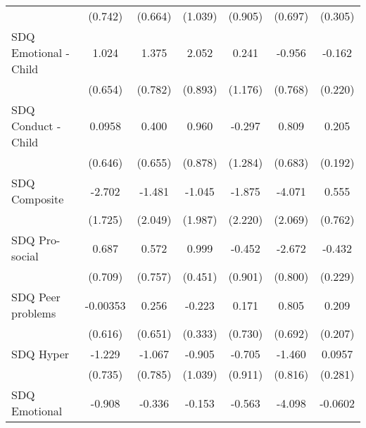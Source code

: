 {\begin{tabular}{l*{6}{c}}
            &     (0.742)         &     (0.664)         &     (1.039)         &     (0.905)         &     (0.697)         &     (0.305)         \\
\addlinespace
SDQ Emotional - Child&       1.024         &       1.375         &       2.052\sym{*}  &       0.241         &      -0.956         &      -0.162         \\
            &     (0.654)         &     (0.782)         &     (0.893)         &     (1.176)         &     (0.768)         &     (0.220)         \\
\addlinespace
SDQ Conduct - Child&      0.0958         &       0.400         &       0.960         &      -0.297         &       0.809         &       0.205         \\
            &     (0.646)         &     (0.655)         &     (0.878)         &     (1.284)         &     (0.683)         &     (0.192)         \\
\addlinespace
SDQ Composite&      -2.702         &      -1.481         &      -1.045         &      -1.875         &      -4.071\sym{*}  &       0.555         \\
            &     (1.725)         &     (2.049)         &     (1.987)         &     (2.220)         &     (2.069)         &     (0.762)         \\
\addlinespace
SDQ Pro-social&       0.687         &       0.572         &       0.999\sym{*}  &      -0.452         &      -2.672\sym{***}&      -0.432         \\
            &     (0.709)         &     (0.757)         &     (0.451)         &     (0.901)         &     (0.800)         &     (0.229)         \\
\addlinespace
SDQ Peer problems&    -0.00353         &       0.256         &      -0.223         &       0.171         &       0.805         &       0.209         \\
            &     (0.616)         &     (0.651)         &     (0.333)         &     (0.730)         &     (0.692)         &     (0.207)         \\
\addlinespace
SDQ Hyper   &      -1.229         &      -1.067         &      -0.905         &      -0.705         &      -1.460         &      0.0957         \\
            &     (0.735)         &     (0.785)         &     (1.039)         &     (0.911)         &     (0.816)         &     (0.281)         \\
\addlinespace
SDQ Emotional&      -0.908         &      -0.336         &      -0.153         &      -0.563         &      -4.098\sym{***}&     -0.0602         \\

\end{tabular}}
